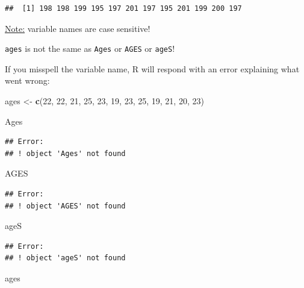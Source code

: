 \documentclass[
]{book}
\newenvironment{Shaded}{\begin{snugshade}}{\end{snugshade}}
\newcommand{\DecValTok}[1]{\textcolor[rgb]{0.00,0.00,0.81}{#1}}
\newcommand{\FunctionTok}[1]{\textcolor[rgb]{0.13,0.29,0.53}{\textbf{#1}}}
\newcommand{\NormalTok}[1]{#1}
\newcommand{\OtherTok}[1]{\textcolor[rgb]{0.56,0.35,0.01}{#1}}
\begin{document}
\begin{verbatim}
##  [1] 198 198 199 195 197 201 197 195 201 199 200 197
\end{verbatim}

\ul{Note:} variable names are case sensitive!

\texttt{ages} is not the same as \texttt{Ages} or \texttt{AGES} or \texttt{ageS}!

If you misspell the variable name, R will respond with an error explaining what went wrong:

\begin{Shaded}
\begin{Highlighting}[]
\NormalTok{ages }\OtherTok{\textless{}{-}} \FunctionTok{c}\NormalTok{(}\DecValTok{22}\NormalTok{, }\DecValTok{22}\NormalTok{, }\DecValTok{21}\NormalTok{, }\DecValTok{25}\NormalTok{, }\DecValTok{23}\NormalTok{, }\DecValTok{19}\NormalTok{, }\DecValTok{23}\NormalTok{, }\DecValTok{25}\NormalTok{, }\DecValTok{19}\NormalTok{, }\DecValTok{21}\NormalTok{, }\DecValTok{20}\NormalTok{, }\DecValTok{23}\NormalTok{)}

\NormalTok{Ages}
\end{Highlighting}
\end{Shaded}

\begin{verbatim}
## Error:
## ! object 'Ages' not found
\end{verbatim}

\begin{Shaded}
\begin{Highlighting}[]
\NormalTok{AGES}
\end{Highlighting}
\end{Shaded}

\begin{verbatim}
## Error:
## ! object 'AGES' not found
\end{verbatim}

\begin{Shaded}
\begin{Highlighting}[]
\NormalTok{ageS}
\end{Highlighting}
\end{Shaded}

\begin{verbatim}
## Error:
## ! object 'ageS' not found
\end{verbatim}

\begin{Shaded}
\begin{Highlighting}[]
\NormalTok{ages}
\end{Highlighting}
\end{Shaded}
\end{document}
